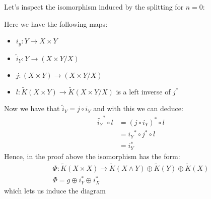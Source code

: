 \begin{cor}
	Let's inspect the isomorphism induced by the splitting for $n=0$: 
	\begin{center}
	\end{center}
	Here we have the following maps:
	\begin{itemize}
		\item $i_y:Y\to X\times Y$
		\item $\tilde{i}_Y:Y\to (X\times Y\slash X)$
		\item $j:(X\times Y)\to (X\times Y\slash X)$
		\item $l:\tilde{K}(X\times Y) \to \tilde{K}(X\times Y\slash X)$ is a left inverse of $j^*$
	\end{itemize}
	Now we have that $\tilde{i}_Y=j\circ i_Y$ and with this we can deduce:
	\begin{align*}
		\tilde{i_Y}^*\circ l&=(j\circ i_Y)^*\circ l \\
		&={i_Y}^*\circ j^* \circ l\\        
		&= i_Y^*
	\end{align*}
	Hence, in the proof above the isomorphism has the form:
	\begin{align*}
		\Phi: \tilde{K}(X\times X)\to \tilde{K}(X\wedge Y)\oplus \tilde{K}(Y)\oplus \tilde{K}(X) \\ 
		\Phi=g\oplus i_Y^*\oplus i_X^*
	\end{align*} which lets us induce the diagram
	\begin{center}
\end{center}
\end{cor}
